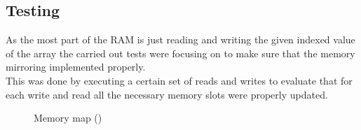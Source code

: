 \documentclass[]{report}
\begin{document}
\subsection{Testing}
As the most part of the RAM is just reading and writing the given indexed value of the array the carried out tests were focusing on to make sure that the memory mirroring implemented properly.
\\
This was done by executing a certain set of reads and writes to evaluate that for each write and read all the necessary memory slots were properly updated.


\begin{figure}[!htb]
	\caption{\label{fig:my-label} Memory map (\cite{NSPF})}
\end{figure}
\clearpage
\end{document}
